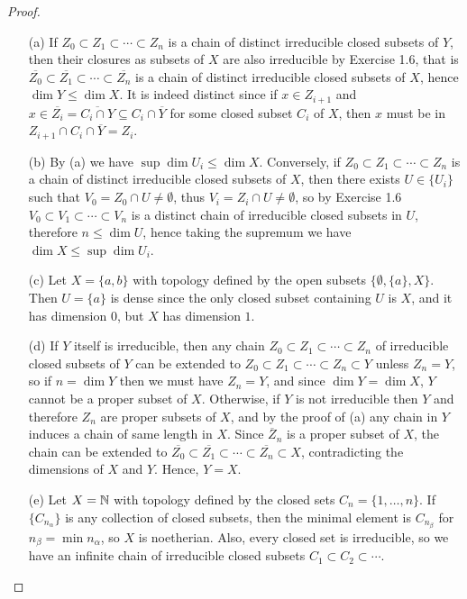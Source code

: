 \documentclass{article}
\begin{document}
\begin{enumerate} [label=\textbf{\arabic*.}, leftmargin=0em]
\begin{proof} $ $ \vspace{0pt}
    \begin{itemize} [leftmargin=0cm]
        \item[(a)] If $Z_0 \subset Z_1 \subset \cdots \subset Z_n$ is a chain of distinct irreducible closed subsets of $Y$, then their closures as subsets of $X$ are also irreducible by Exercise 1.6, that is $\overline{Z_0} \subset \overline{Z_1} \subset \cdots \subset \overline{Z_n}$ is a chain of distinct irreducible closed subsets of $X$, hence $\dim{Y} \leq \dim{X}$. It is indeed distinct since if $x \in Z_{i + 1}$ and $x \in \overline{Z_i} = \overline{C_i \cap Y} \subseteq C_i \cap \overline{Y}$ for some closed subset $C_i$ of $X$, then $x$ must be in $Z_{i + 1} \cap C_i \cap \overline{Y} = Z_i$.

        \item[(b)] By (a) we have $\sup{\dim{U_i}} \leq \dim{X}$. Conversely, if $Z_0 \subset Z_1 \subset \cdots \subset Z_n$ is a chain of distinct irreducible closed subsets of $X$, then there exists $U \in \{U_i\}$ such that $V_0 = Z_0 \cap U \neq \emptyset$, thus $V_i = Z_i \cap U \neq \emptyset$, so by Exercise 1.6 $V_0 \subset V_1 \subset \cdots \subset V_n$ is a distinct chain of irreducible closed subsets in $U$, therefore $n \leq \dim{U}$, hence taking the supremum we have $\dim{X} \leq \sup{\dim{U_i}}$.

        \item[(c)] Let $X = \{ a, b \}$ with topology defined by the open subsets $\{ \emptyset, \{a \}, X \}$. Then $U = \{a \}$ is dense since the only closed subset containing $U$ is $X$, and it has dimension $0$, but $X$ has dimension $1$.

        \item[(d)] If $Y$ itself is irreducible, then any chain $Z_0 \subset Z_1 \subset \cdots \subset Z_n$ of irreducible closed subsets of $Y$ can be extended to $Z_0 \subset Z_1 \subset \cdots \subset Z_n \subset Y$ unless $Z_n = Y$, so if $n = \dim{Y}$ then we must have $Z_n = Y$, and since $\dim{Y} = \dim{X}$, $Y$ cannot be a proper subset of $X$. Otherwise, if $Y$ is not irreducible then $Y$ and therefore $Z_n$ are proper subsets of $X$, and by the proof of (a) any chain in $Y$ induces a chain of same length in $X$. Since $\overline{Z}_n$ is a proper subset of $X$, the chain can be extended to $\overline{Z_0} \subset \overline{Z_1} \subset \cdots \subset \overline{Z_n} \subset X$, contradicting the dimensions of $X$ and $Y$. Hence, $Y = X$.

        \item[(e)] Let $X = \mathbb{N}$ with topology defined by the closed sets $C_n = \{1, \dots, n \}$. If $\{ C_{n_\alpha}\}$ is any collection of closed subsets, then the minimal element is $C_{n_\beta}$ for $n_\beta = \min{n_\alpha}$, so $X$ is noetherian. Also, every closed set is irreducible, so we have an infinite chain of irreducible closed subsets $C_1 \subset C_2 \subset \cdots$.
    \end{itemize}
\end{proof}

\end{enumerate}
\end{document}

